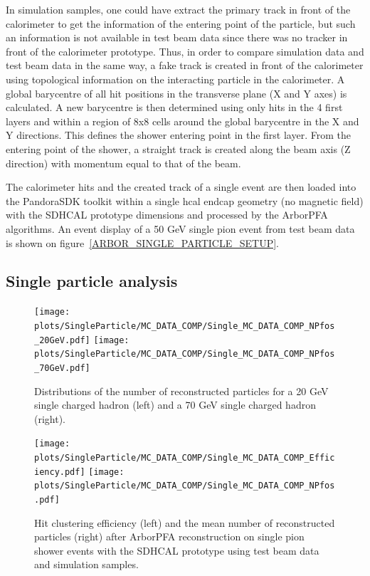 \documentclass[cits]{JINST}
\begin{document}
In simulation samples, one could have extract the primary track in front of the calorimeter to get the information of the entering point of the particle, but such an information is not available in test beam data since there was no tracker in front of the calorimeter prototype. Thus, in order to compare simulation data and test beam data in the same way, a fake track is created in front of the calorimeter using topological information on the interacting particle in the calorimeter. A global barycentre of all hit positions in the transverse plane (X and Y axes) is calculated. A new barycentre is then determined using only hits in the 4 first layers and within a region of 8x8 cells around the global barycentre in the X and Y directions. This defines the shower entering point in the first layer. From the entering point of the shower, a straight track is created along the beam axis (Z direction) with momentum equal to that of the beam.

The calorimeter hits and the created track of a single event are then loaded into the PandoraSDK toolkit \cite{pandora-sdk} within a single hcal endcap geometry (no magnetic field) with the SDHCAL prototype dimensions and processed by the ArborPFA algorithms. An event display of a 50 GeV single pion event from test beam data is shown on figure~\ref{ARBOR_SINGLE_PARTICLE_SETUP}.

\subsection{Single particle analysis}

\begin{figure}[!h]
  \begin{center}
    \texttt{[image: plots/SingleParticle/MC\_DATA\_COMP/Single\_MC\_DATA\_COMP\_NPfos\_20GeV.pdf]}
    \texttt{[image: plots/SingleParticle/MC\_DATA\_COMP/Single\_MC\_DATA\_COMP\_NPfos\_70GeV.pdf]} \\
  \end{center}
  \caption{\label{ARBOR_SINGLE_PARTICLE_NPFOS_20_AND_70_GEV} Distributions of the number of reconstructed particles for a 20 GeV single charged hadron (left) and a 70 GeV single charged hadron (right).}
\end{figure}

\begin{figure}[!h]
  \begin{center}
    \texttt{[image: plots/SingleParticle/MC\_DATA\_COMP/Single\_MC\_DATA\_COMP\_Efficiency.pdf]}
    \texttt{[image: plots/SingleParticle/MC\_DATA\_COMP/Single\_MC\_DATA\_COMP\_NPfos.pdf]} \\
  \end{center}
  \caption{\label{ARBOR_SINGLE_PARTICLE_EFFICIENCY_AND_NPFOS} Hit clustering efficiency (left) and the mean number of reconstructed particles (right) after ArborPFA reconstruction on single pion shower events with the SDHCAL prototype using test beam data and simulation samples.}
\end{figure}
\end{document}
